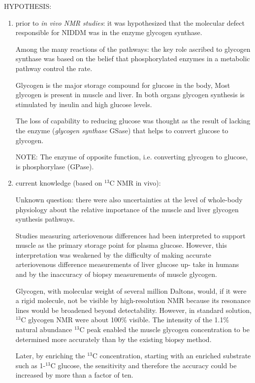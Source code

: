 HYPOTHESIS:
\begin{enumerate}
  \item prior to {\it in vivo NMR studies}: it was hypothesized that
  the molecular defect responsible for NIDDM was in the enzyme glycogen synthase.
  
  Among the many reactions of the pathways:
  the key role ascribed to glycogen synthase was based on the belief that
  phosphorylated enzymes in a metabolic pathway control the rate.
  
  
  Glycogen is the major storage compound for glucose in the body, Most glycogen
  is present in muscle and liver. In both organs glycogen synthesis is
  stimulated by insulin and high glucose levels.
  
  
  The loss of capability to reducing glucose was thought as the result of
  lacking the enzyme ({\it glycogen synthase} GSase) that helps to convert
  glucose to glycogen. 
  
  NOTE: The enzyme of opposite function, i.e. converting glycogen to glucose, is
  phosphorylase (GPase). 
  
  
  
  \item current knowledge (based on $^{13}$C NMR in vivo):
  
\begin{mdframed}
  Unknown question: there were also uncertainties at the level of whole-body
  physiology about the relative importance of the muscle and liver glycogen
  synthesis pathways.
  
  Studies measuring arteriovenous differences had been interpreted to support
  muscle as the primary storage point for plasma glucose. However, this
  interpretation was weakened by the difficulty of making accurate arteriovenous
  difference measurements of liver glucose up- take in humans and by the
  inaccuracy of biopsy measurements of muscle glycogen.

Glycogen, with molecular weight of several million Daltons, would, if it were a
rigid molecule, not be visible by high-resolution NMR because its resonance
lines would be broadened beyond detectability.
However, in standard solution, $^{13}$C glycogen NMR were about 100\% visible.
The intensity of the 1.1\% natural abundance $^{13}$C peak enabled the muscle
glycogen concentration to be determined more accurately than by the existing
biopsy method.

Later, by enriching the $^{13}$C concentration, starting with an enriched
substrate such as 1-$^{13}$C glucose, the sensitivity and therefore the accuracy
could be increased by more than a factor of ten.


\end{mdframed}
\end{enumerate}

